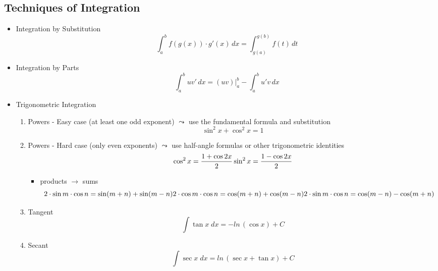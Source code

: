 \subsection{Techniques of Integration}
	\begin{itemize}
		\item Integration by Substitution
			\begin{equation}
				\int_a^b f(g(x)) \cdot g'(x) \, dx = \int_{g(a)}^{g(b)} f(t) \, dt
			\end{equation}
		\item Integration by Parts
			\begin{equation}
				\int_a^b uv' \, dx = (uv)|_a^b - \int_a^b u' v \, dx
			\end{equation}
		\item Trigonometric Integration
			\begin{enumerate}
				\item Powers - Easy case (at least one odd exponent) $\leadsto$ use the fundamental formula and substitution
					\begin{equation}
						\sin^2 x + \cos^2 x = 1
					\end{equation}
				\item Powers - Hard case (only even exponents) $\leadsto$ use half-angle formulas or other trigonometric identities
					\begin{equation}
						\cos^2 x = \frac{1+\cos 2x}{2} \\
						\sin^2 x = \frac{1-\cos 2x}{2}
					\end{equation}
					\begin{itemize}
						\item products $\rightarrow$ sums
							\begin{equation}
								2 \cdot \sin m \cdot \cos n = \sin (m+n) + \sin (m-n) \\
								2 \cdot \cos m \cdot \cos n = \cos (m+n) + \cos (m-n) \\
								2 \cdot \sin m \cdot \cos n = \cos (m-n) - \cos (m+n)
							\end{equation}
					\end{itemize}
				\item Tangent
					\begin{equation}
						\int \tan x \; dx = - ln \, ( \cos x) + C
					\end{equation}
				\item Secant
					\begin{equation}
						\int \sec x \; dx = ln \, (\sec x + \tan x) + C

\end{equation}
\end{enumerate}
\end{itemize}
